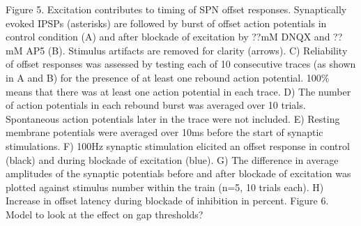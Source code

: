 \documentclass{article}
\begin{document}
Figure 5. Excitation contributes to timing of SPN offset responses. Synaptically evoked IPSPs (asterisks) are followed by burst of offset action potentials in control condition (A) and after blockade of excitation by ??mM DNQX and ??mM AP5 (B). Stimulus artifacts are removed for clarity (arrows). C) Reliability of offset responses was assessed by testing each of 10 consecutive traces (as shown in A and B) for the presence of at least one rebound action potential. 100\% means that there was at least one action potential in each trace. D) The number of action potentials in each rebound burst was averaged over 10 trials. Spontaneous action potentials later in the trace were not included. E) Resting membrane potentials were averaged over 10ms before the start of synaptic stimulations. F) 100Hz synaptic stimulation elicited an offset response in control (black) and during blockade of excitation (blue). G) The difference in average amplitudes of the synaptic potentials before and after blockade of excitation was plotted against stimulus number within the train (n=5, 10 trials each). H) Increase in offset latency during blockade of inhibition in percent.
Figure 6. Model to look at the effect on gap thresholds?
\end{document}
